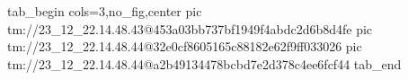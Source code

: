  
 
 
 
 

\qqSecOrig


\ifcmt
  tab_begin cols=3,no_fig,center
    pic tm://23_12_22.14.48.43@453a03bb737bf1949f4abdc2d6b8d4fe
    pic tm://23_12_22.14.48.44@32e0cf8605165c88182e62f9ff033026
    pic tm://23_12_22.14.48.44@a2b49134478bcbd7e2d378c4ee6fcf44
  tab_end
\fi

